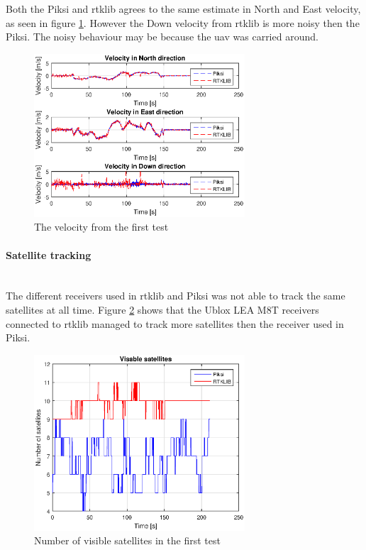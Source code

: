 Both the Piksi and \gls{rtklib} agrees to the same estimate in North and East velocity, as seen in figure \ref{figure:VelocityWalk1}. However the Down velocity from \gls{rtklib} is more noisy then the Piksi. The noisy behaviour may be because the \gls{uav} was carried around.
\begin{figure}[H]
	\centering
		\includegraphics[width=0.7\textwidth]{figs/plots/velocityWalk1.eps}
		\caption{The velocity from the first test}
		\label{figure:VelocityWalk1}
\end{figure}
\paragraph{Satellite tracking}~\\

The different receivers used in \gls{rtklib} and Piksi was not able to track the same satellites at all time. Figure \ref{figure:NumSatWalk1} shows that the Ublox LEA M8T receivers connected to \gls{rtklib} managed to track more satellites then the receiver used in Piksi. 
\begin{figure}[H]
	\centering
		\includegraphics[width=0.7\textwidth]{figs/plots/numSatWalk1.eps}
		\caption{Number of visible satellites in the first test}
		\label{figure:NumSatWalk1}
\end{figure}

